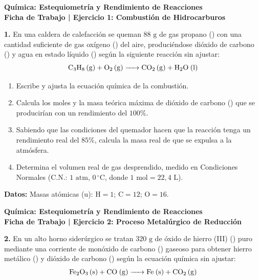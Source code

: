 ﻿\documentclass[11pt,a4paper]{article}
\begin{document}
\pagestyle{empty}

\begin{center}
    {\LARGE \textbf{Química: Estequiometría y Rendimiento de Reacciones}}\\[4pt]
    {\large \textbf{Ficha de Trabajo | Ejercicio 1: Combustión de Hidrocarburos}}
\end{center}

\vspace{0.8cm}
\noindent\textbf{1.} En una caldera de calefacción se queman $88\text{ g}$ de gas propano () con una cantidad suficiente de gas oxígeno () del aire, produciéndose dióxido de carbono () y agua en estado líquido () según la siguiente reacción sin ajustar:
\[
\ce{C3H8 (g) + O2 (g) -> CO2 (g) + H2O (l)}
\]

\begin{enumerate}[label=\textbf{\alph*)}, leftmargin=2em, itemsep=12pt]
    \item Escribe y ajusta la ecuación química de la combustión.
    \item Calcula los moles y la masa teórica máxima de dióxido de carbono () que se producirían con un rendimiento del $100\%$.
    \item Sabiendo que las condiciones del quemador hacen que la reacción tenga un rendimiento real del $85\%$, calcula la masa real de  que se expulsa a la atmósfera.
    \item Determina el volumen real de gas  desprendido, medido en Condiciones Normales ($\text{C.N.}$: $1\text{ atm}$, $0\,^\circ\text{C}$, donde $1\text{ mol} = 22{,}4\text{ L}$).
\end{enumerate}

\vspace{0.5cm}
\noindent\textbf{Datos:} Masas atómicas ($\text{u}$): $\mathrm{H} = 1$; $\mathrm{C} = 12$; $\mathrm{O} = 16$.

\newpage

\begin{center}
    {\LARGE \textbf{Química: Estequiometría y Rendimiento de Reacciones}}\\[4pt]
    {\large \textbf{Ficha de Trabajo | Ejercicio 2: Proceso Metalúrgico de Reducción}}
\end{center}

\vspace{0.8cm}
\noindent\textbf{2.} En un alto horno siderúrgico se tratan $320\text{ g}$ de óxido de hierro (III) () puro mediante una corriente de monóxido de carbono () gaseoso para obtener hierro metálico () y dióxido de carbono () según la ecuación química sin ajustar:
\[
\ce{Fe2O3 (s) + CO (g) -> Fe (s) + CO2 (g)}
\]
\end{document}
